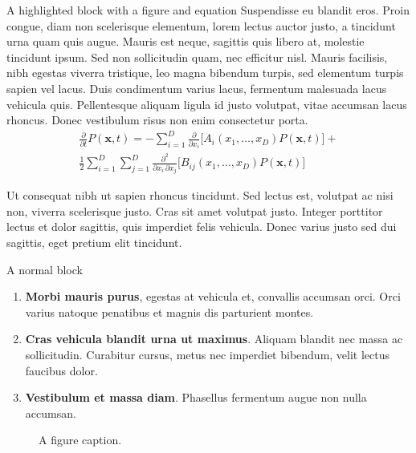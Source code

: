 \documentclass[final]{beamer}
\newlength{\colwidth}
\begin{document}
\begin{frame}[t]
\begin{columns}[t]
\begin{column}{\colwidth}
\begin{alertblock}{A highlighted block with a figure and equation}
Suspendisse eu blandit eros. Proin congue, diam non scelerisque elementum, lorem lectus auctor justo, a tincidunt urna quam quis augue. Mauris est neque, sagittis quis libero at, molestie tincidunt ipsum. Sed non sollicitudin quam, nec efficitur nisl. Mauris facilisis, nibh egestas viverra tristique, leo magna bibendum turpis, sed elementum turpis sapien vel lacus. Duis condimentum varius lacus, fermentum malesuada lacus vehicula quis. Pellentesque aliquam ligula id justo volutpat, vitae accumsan lacus rhoncus. Donec vestibulum risus non enim consectetur porta. 
\begin{align*}
    \frac{\partial}{\partial t} P(\mathbf{x},t) = -\sum_{i=1}^{D} \frac{\partial}{\partial x_i} \Big[ A_i(x_1, \ldots, x_D) P(\mathbf{x},t) \Big] + \\
    \frac{1}{2} \sum_{i=1}^{D} \sum_{j=1}^{D} \frac{\partial^2}{\partial x_i \, \partial x_j} \Big[ B_{ij}(x_1, \ldots, x_D) P(\mathbf{x},t) \Big]
\end{align*}
	
Ut consequat nibh ut sapien rhoncus tincidunt. Sed lectus est, volutpat ac nisi non, viverra scelerisque justo. Cras sit amet volutpat justo. Integer porttitor lectus et dolor sagittis, quis imperdiet felis vehicula. Donec varius justo sed dui sagittis, eget pretium elit tincidunt. 
  \end{alertblock}
  \begin{block}{A normal block}


    \begin{enumerate}
      \item \textbf{Morbi mauris purus}, egestas at vehicula et, convallis
        accumsan orci. Orci varius natoque penatibus et magnis dis parturient
        montes.
      \item \textbf{Cras vehicula blandit urna ut maximus}. Aliquam blandit nec
        massa ac sollicitudin. Curabitur cursus, metus nec imperdiet bibendum,
        velit lectus faucibus dolor.
      \item \textbf{Vestibulum et massa diam}. Phasellus fermentum augue non
        nulla accumsan.
    \end{enumerate}


   \begin{figure}
      \centering
      \caption{A figure caption.}
    \end{figure}


\end{block}
\end{column}
\end{columns}
\end{frame}
\end{document}
